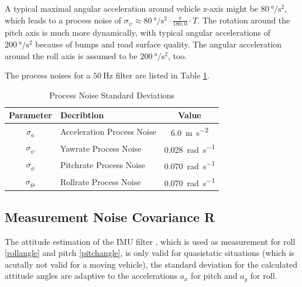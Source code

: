 \documentclass[conference]{IEEEtran}
\begin{document}
A typical maximal angular acceleration around vehicle z-axis might be $\SI{80}{\degree\per\square\second}$, which leads to a process noise of $\sigma_{\dot\psi} \approx \SI{80}{\degree\per\square\second} \cdot \frac{\pi}{180{,}0} \cdot T$.
The rotation around the pitch axis is much more dynamically, with typical angular accelerations of $\SI{200}{\degree\per\square\second}$ because of bumps and road surface quality. The angular acceleration around the roll axis is assumed to be $\SI{200}{\degree\per\square\second}$, too.

The process noises for a $\SI{50}{\hertz}$ filter are listed in Table \ref{processnoisetable}.

\begin{table}[ht]
\renewcommand{\arraystretch}{1.3}
\caption{Process Noise Standard Deviations}
\label{processnoisetable}
\centering
\begin{tabular}{c l c}
\hline
Parameter & Decribtion & Value\\
\hline
$\sigma_a$ & Acceleration Process Noise & \SI{6.0}{\metre\per\square\second} \\
$\sigma_{\dot \psi}$ & Yawrate Process Noise & \SI{0.028}{\radian\per\second}\\
$\sigma_{\dot \phi}$ & Pitchrate Process Noise & \SI{0.070}{\radian\per\second}\\
$\sigma_{\dot \Theta}$ & Rollrate Process Noise & \SI{0.070}{\radian\per\second}\\
\hline
\end{tabular}
\end{table}

\subsection{Measurement Noise Covariance R}

The attitude estimation of the IMU filter \cite{Madgwick2010}, which is used as measurement for roll \eqref{rollangle} and pitch \eqref{pitchangle}, is only valid for quasistatic situations (which is acutally not valid for a moving vehicle), the standard deviation for the calculated attitude angles are adaptive to the accelerations $a_x$ for pitch and $a_y$ for roll.
\end{document}
